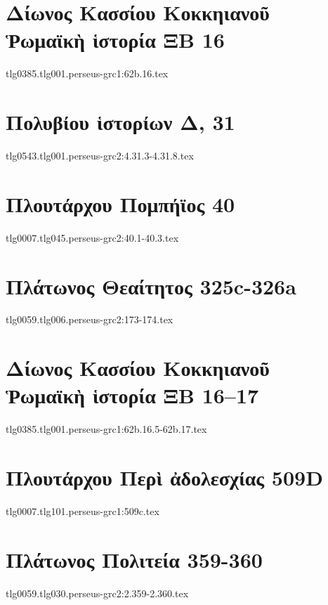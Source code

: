 \documentclass[a4paper,12pt,twoside]{report}
\begin{document}
\chapter[Δίωνος Κασσίου Ῥωμαϊκὴ ἱστορία ΞΒ 16]{\textgreek[variant=ancient]{Δίωνος Κασσίου Κοκκηιανοῦ\\Ῥωμαϊκὴ ἱστορία ΞΒ} 16}
{tlg0385.tlg001.perseus-grc1:62b.16.tex}

\chapter[Πολυβίου Ἱστορίων Δ]{\textgreek[variant=ancient]{Πολυβίου ἱστορίων Δ,} 31}
{tlg0543.tlg001.perseus-grc2:4.31.3-4.31.8.tex}

\chapter[Πλουτάρχου Πομπήϊος]{\textgreek[variant=ancient]{Πλουτάρχου Πομπήϊος} 40}
{tlg0007.tlg045.perseus-grc2:40.1-40.3.tex}

\chapter[Πλάτωνος Θεαίτητος]{\textgreek[variant=ancient]{Πλάτωνος Θεαίτητος} 325c-326a}
{tlg0059.tlg006.perseus-grc2:173-174.tex}

\chapter[Δίωνος Κασσίου Ῥωμαϊκὴ ἱστορία ΞΒ 16–17]{\textgreek[variant=ancient]{Δίωνος Κασσίου Κοκκηιανοῦ \\Ῥωμαϊκὴ ἱστορία ΞΒ} 16–17}
{tlg0385.tlg001.perseus-grc1:62b.16.5-62b.17.tex}

\chapter[Πλουτάρχου Περὶ ἀδολεσχίας  509D]{\textgreek[variant=ancient]{Πλουτάρχου Περὶ ἀδολεσχίας} 509D}
{tlg0007.tlg101.perseus-grc1:509c.tex}

\chapter[Πλάτωνος Πολιτεία]{\textgreek[variant=ancient]{Πλάτωνος Πολιτεία} 359-360}
{tlg0059.tlg030.perseus-grc2:2.359-2.360.tex}
\end{document}
